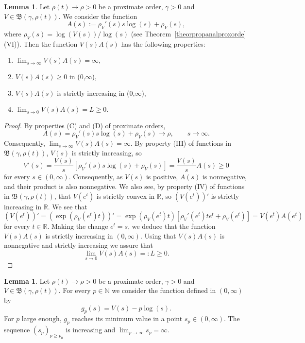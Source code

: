 \documentclass[11pt,a4paper]{article}
\theoremstyle{definition}
\newtheorem{lemma}[theo]{Lemma}
\def\oo{\infty}
\def\ri{\rightarrow}
\def\ga{\gamma}
\def\ro{\rho}
\def\Bet{\mathfrak{B}}
\def\N{\mathbb{N}}
\def\R{\mathbb{R}}
\begin{document}
 \begin{lemma}\label{prop.properties.V.A}
  Let $\ro(t) \ri \ro>0$ be a proximate order,  $\ga>0$ and $V \in \Bet(\ga, \ro(t) )$. We consider the function
  $$A(s):=\ro_V'(s)s\log(s)+\ro_V(s),$$
where $\rho_V(s)=\log(V(s))/\log(s)$ (see Theorem~\ref{theorpropanalproxorde}(VI)).  Then the function $V(s)A(s)$ has the following properties:
  \begin{enumerate}[(1)]
  \item $\lim_{s\ri\oo} V(s)A(s)=\oo$,
  \item $V(s)A(s)\geq 0$ in (0,$\oo$),
 \item $V(s)A(s)$ is strictly increasing in (0,$\oo$),
 \item $\lim_{s\ri0}V(s)A(s)=L\geq 0.$
\end{enumerate}

 \end{lemma}

 \begin{proof}

By properties (C) and (D) of proximate orders,
 $$A(s)=\ro_V'(s)s\log(s)+\ro_V(s)\ri \ro, \qquad s\ri\oo.$$
Consequently, $\lim_{s\ri\oo} V(s)A(s)=\oo. $
By property (III) of functions in $\Bet(\ga, \ro(t))$, $V(s)$  is strictly increasing, so
\begin{equation*}
V'(s)= \frac{V(s)}{s}[\ro_V'(s)s\log(s)+\ro_V(s)] = \frac{V(s)}{s} A(s)\geq 0
\end{equation*}
for every $s\in(0,\oo)$. Consequently, as $V(s)$ is positive, $A(s)$ is nonnegative, and their product is also nonnegative.
We also see, by property (IV) of functions in $\Bet(\ga, \ro(t))$, that
$V(e^t)$ is strictly convex in $\R$, so $(V(e^t))'$ is strictly increasing in $\R$. We see that
$$ (V(e^t))'= (\exp(\ro_V(e^t) t))' = \exp(\ro_V(e^t)t)[\ro_V'(e^t) t e^t+\ro_V(e^t) ] = V(e^t)A(e^t) $$
for every $t\in\R$. Making the change $e^t=s$, we deduce that the function $V(s) A(s)$ is strictly increasing in
$(0,\oo)$. Using that $V(s)A(s)$ is nonnegative and strictly increasing  we assure that
$$\lim_{s\ri0}V(s)A(s)=:L\geq 0.$$
 \end{proof}



 \begin{lemma}\label{lemmafuncg}
    Let $\ro(t) \ri \ro>0$ be a proximate order,  $\ga>0$ and $V \in \Bet(\ga, \ro(t) )$. For every $p\in\N$
    we consider the function defined in $(0,\oo)$ by
    $$g_{p}(s)= V(s)- p\log(s).$$
    For $p$ large enough, $g_{p}$ reaches its minimum value in a point $s_p\in(0,\oo)$. The
    sequence $(s_p)_{p\geq p_0}$ is increasing and
    $\lim_{p\ri\oo} s_p=\oo$.
 \end{lemma}
\end{document}
